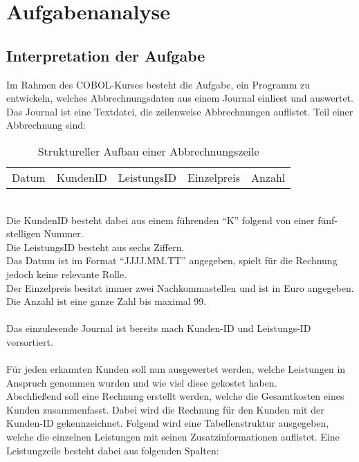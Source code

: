 \chapter{Aufgabenanalyse}\label{ch:aufgabenanalyse}


\section{Interpretation der Aufgabe}\label{sec:interpretation-der-aufgabe}
Im Rahmen des COBOL-Kurses besteht die Aufgabe, ein Programm zu entwickeln, welches Abbrechnungsdaten aus einem Journal einliest und auswertet.\\
\noindent
Das Journal ist eine Textdatei, die zeilenweise Abbrechnungen auflistet. Teil einer Abbrechnung sind: 

\begin{table}[h]
    \centering
    \begin{tabular}{|l|l|l|l|l|}
        Datum & KundenID & LeistungsID & Einzelpreis & Anzahl
    \end{tabular}
    \caption{Struktureller Aufbau einer Abbrechnungszeile}
\end{table}

\noindent
\\
Die KundenID besteht dabei aus einem führenden \enquote{K} folgend von einer fünf-stelligen Nummer.\\
Die LeistungsID besteht aus sechs Ziffern.\\
Das Datum ist im Format \enquote{JJJJ.MM.TT} angegeben, spielt für die Rechnung jedoch keine relevante Rolle.\\
Der Einzelpreis besitzt immer zwei Nachkommastellen und ist in Euro angegeben.\\
Die Anzahl ist eine ganze Zahl bis maximal 99.\\
\\
Das einzulesende Journal ist bereits mach Kunden-ID und Leistungs-ID vorsortiert.
\\
\\
Für jeden erkannten Kunden soll nun ausgewertet werden, welche Leistungen in Anspruch genommen wurden und wie viel diese gekostet haben.
\\
Abschließend soll eine Rechnung erstellt werden, welche die Gesamtkosten eines Kunden zusammenfasst. Dabei wird die Rechnung für den Kunden mit der Kunden-ID gekennzeichnet. Folgend wird eine Tabellenstruktur ausgegeben, welche die einzelnen Leistungen mit seinen Zusatzinformationen auflistet. Eine Leistungzeile besteht dabei aus folgenden Spalten:\\

